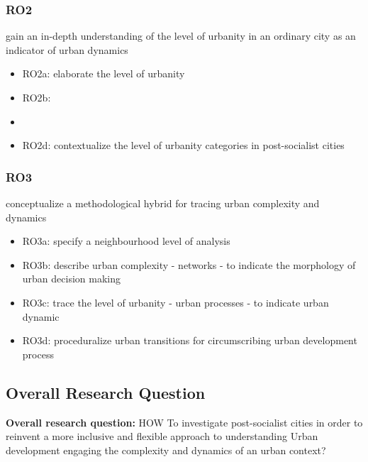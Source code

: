 \documentclass[11pt]{report}
\begin{document}
\subsubsection{RO2}
gain an in-depth understanding of the level of urbanity in an ordinary city as an indicator of urban dynamics
\begin{itemize}
\item RO2a: elaborate the level of urbanity 
\item RO2b:  
\item {}
\item RO2d: contextualize the level of urbanity categories  in post-socialist cities 
\end{itemize}

\subsubsection{RO3}
conceptualize a methodological hybrid for tracing urban complexity and dynamics
\begin{itemize}
\item RO3a: specify a neighbourhood level of analysis 
\item RO3b: describe urban complexity - networks - to indicate the morphology of urban decision making
\item RO3c: trace the level of urbanity - urban processes - to indicate urban dynamic
\item RO3d: proceduralize urban transitions for circumscribing urban development process
\end{itemize}

\subsection{Overall Research Question}

\textbf{Overall research question:} HOW To investigate  post-socialist cities in order to reinvent a more inclusive and flexible approach to understanding Urban development engaging the complexity and dynamics of an urban context? 
\end{document}
